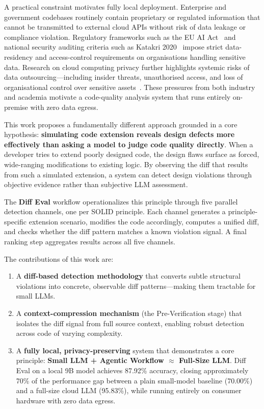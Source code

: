 \documentclass[12pt,a4paper,oneside]{report}
\begin{document}
A practical constraint motivates fully local deployment. Enterprise and government codebases routinely contain proprietary or regulated information that cannot be transmitted to external cloud APIs without risk of data leakage or compliance violation. Regulatory frameworks such as the EU AI Act~\cite{EUAIAct2024} and national security auditing criteria such as Katakri 2020~\cite{Katakri2020} impose strict data-residency and access-control requirements on organisations handling sensitive data. Research on cloud computing privacy further highlights systemic risks of data outsourcing---including insider threats, unauthorised access, and loss of organisational control over sensitive assets~\cite{Ghorbel2017}. These pressures from both industry and academia motivate a code-quality analysis system that runs entirely on-premise with zero data egress.

This work proposes a fundamentally different approach grounded in a core hypothesis: \textbf{simulating code extension reveals design defects more effectively than asking a model to judge code quality directly}. When a developer tries to extend poorly designed code, the design flaws surface as forced, wide-ranging modifications to existing logic. By observing the diff that results from such a simulated extension, a system can detect design violations through objective evidence rather than subjective LLM assessment.

The \textbf{Diff Eval} workflow operationalizes this principle through five parallel detection channels, one per SOLID principle. Each channel generates a principle-specific extension scenario, modifies the code accordingly, computes a unified diff, and checks whether the diff pattern matches a known violation signal. A final ranking step aggregates results across all five channels.

The contributions of this work are:
\begin{enumerate}
  \item A \textbf{diff-based detection methodology} that converts subtle structural violations into concrete, observable diff patterns---making them tractable for small LLMs.
  \item A \textbf{context-compression mechanism} (the Pre-Verification stage) that isolates the diff signal from full source context, enabling robust detection across code of varying complexity.
  \item A \textbf{fully local, privacy-preserving} system that demonstrates a core principle: \textbf{Small LLM + Agentic Workflow $\approx$ Full-Size LLM}. Diff Eval on a local 9B model achieves 87.92\% accuracy, closing approximately 70\% of the performance gap between a plain small-model baseline (70.00\%) and a full-size cloud LLM (95.83\%), while running entirely on consumer hardware with zero data egress.
\end{enumerate}
\end{document}
